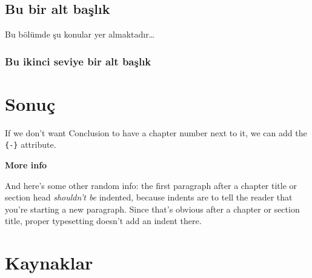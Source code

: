\documentclass[12pt,twoside]{deuthesis}
\begin{document}
\hypertarget{bu-bir-alt-baux15flux131k-1}{%
\section{Bu bir alt başlık}\label{bu-bir-alt-baux15flux131k-1}}

Bu bölümde şu konular yer almaktadır\ldots{}

\hypertarget{bu-ikinci-seviye-bir-alt-baux15flux131k-1}{%
\subsection{Bu ikinci seviye bir alt başlık}\label{bu-ikinci-seviye-bir-alt-baux15flux131k-1}}

\hypertarget{sonuuxe7}{%
\chapter*{Sonuç}\label{sonuuxe7}}

If we don't want Conclusion to have a chapter number next to it, we can add the \texttt{\{-\}} attribute.

\textbf{More info}

And here's some other random info: the first paragraph after a chapter title or section head \emph{shouldn't be} indented, because indents are to tell the reader that you're starting a new paragraph. Since that's obvious after a chapter or section title, proper typesetting doesn't add an indent there.

\hypertarget{kaynaklar}{%
\chapter*{Kaynaklar}\label{kaynaklar}}

\end{document}
